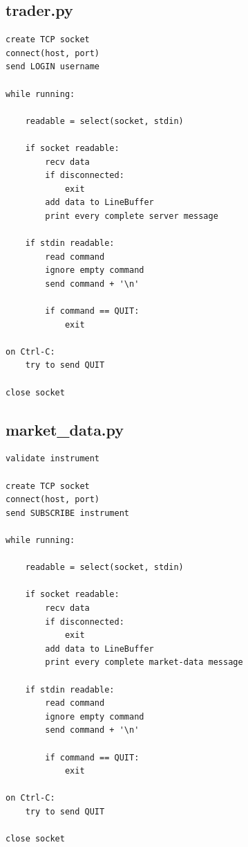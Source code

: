 \documentclass[11pt,a4paper]{article}
\begin{document}

\subsection{{trader.py}}

\begin{lstlisting}[style=pseudocode]
create TCP socket
connect(host, port)
send LOGIN username

while running:

    readable = select(socket, stdin)

    if socket readable:
        recv data
        if disconnected:
            exit
        add data to LineBuffer
        print every complete server message

    if stdin readable:
        read command
        ignore empty command
        send command + '\n'

        if command == QUIT:
            exit

on Ctrl-C:
    try to send QUIT

close socket
\end{lstlisting}


\subsection{{market\_data.py}}

\begin{lstlisting}[style=pseudocode]
validate instrument

create TCP socket
connect(host, port)
send SUBSCRIBE instrument

while running:

    readable = select(socket, stdin)

    if socket readable:
        recv data
        if disconnected:
            exit
        add data to LineBuffer
        print every complete market-data message

    if stdin readable:
        read command
        ignore empty command
        send command + '\n'

        if command == QUIT:
            exit

on Ctrl-C:
    try to send QUIT

close socket
\end{lstlisting}
\end{document}
